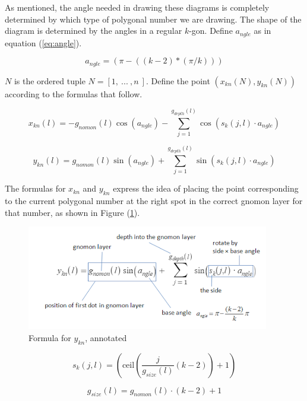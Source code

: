 \documentclass{article}
\begin{document}
As mentioned, the angle needed in drawing these diagrams is completely determined by which type of polygonal number we are drawing. The shape of the diagram is determined by the angles in a regular $k$-gon. Define $a_{ngle}$ as in equation (\ref{eq:angle}).

\begin{equation}
    a_{ngle}=\left(\pi-((k-2)*(\pi/k))\right)
\label{eq:angle}
\end{equation}


$N$ is the ordered tuple $N=\left[1,\ ...\ ,n\ \right]$. Define the point $\left(x_{kn}\left(N\right),y_{kn}\left(N\right)\right)$ according to the formulas that follow.

\begin{equation}
x_{kn}\left(l\right)=-g_{nomon}\left(l\right)\cos\left(a_{ngle}\right)-\sum_{j=1}^{g_{depth}\left(l\right)}\cos\left(s_{k}\left(j,l\right)\cdot a_{ngle}\right)
\end{equation}

\begin{equation}    y_{kn}\left(l\right)=g_{nomon}\left(l\right)\sin\left(a_{ngle}\right)+\sum_{j=1}^{g_{depth}\left(l\right)}\sin\left(s_{k}\left(j,l\right)\cdot a_{ngle}\right)
\label{eq:yformula}
\end{equation}

The formulas for $x_{kn}$ and $y_{kn}$ express the idea of placing the point corresponding to the current polygonal number at the right spot in the correct gnomon layer for that number, as shown in Figure (\ref{fig:yannotated}).

\begin{figure}
    \centering
    \includegraphics[width=0.5\linewidth]{annotated_eqn.PNG}
    \caption{Formula for $y_{kn}$, annotated}
    \label{fig:yannotated}
\end{figure}


\begin{equation}
s_{k}\left(j,l\right)=\left(\text{ceil}\left(\frac{j}{g_{size}\left(l\right)}\left(k-2\right)\right)+1\right)
\end{equation}

\begin{equation}
g_{size}\left(l\right)=g_{nomon}\left(l\right)\cdot\left(k-2\right)+1
\end{equation}
\end{document}
